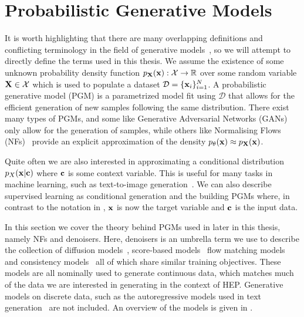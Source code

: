 \chapter{Probabilistic Generative Models}

It is worth highlighting that there are many overlapping definitions and conflicting terminology in the field of generative models~\cite{DiscriminativeVsGenerative, MachineLearningDiscriminative}, so we will attempt to directly define the terms used in this thesis.
We assume the existence of some unknown probability density function $p_{\mathbf{X}}(\mathbf{x}): \mathcal{X} \rightarrow \mathbb{R}$ over some random variable $\mathbf{X} \in \mathcal{X}$ which is used to populate a dataset $\mathcal{D} = \{\mathbf{x}_i\}_{i=1}^N$.
A probabilistic generative model (PGM) is a parametrized model fit using $\mathcal{D}$ that allows for the efficient generation of new samples following the same distribution.
There exist many types of PGMs, and some like Generative Adversarial Networks (GANs)~\cite{GenerativeAdversarialNetworks} only allow for the generation of samples, while others like Normalising Flows (NFs)~\cite{VariationalInferenceNormalizing} provide an explicit approximation of the density $p_{\theta}(\mathbf{x}) \approx p_{\mathbf{X}}(\mathbf{x})$.

Quite often we are also interested in approximating a conditional distribution $p_{X}(\mathbf{x}|\mathbf{c})$ where $\mathbf{c}$ is some context variable.
This is useful for many tasks in machine learning, such as text-to-image generation~\cite{Dalle}.
We can also describe supervised learning as conditional generation and the building PGMs where, in contrast to the notation in , $\mathbf{x}$ is now the target variable and $\mathbf{c}$ is the input data.

In this section we cover the theory behind PGMs used in later in this thesis, namely NFs and denoisers.
Here, denoisers is an umbrella term we use to describe the collection of diffusion models~\cite{DDPM, DDIM}, score-based models~\cite{ScoreBasedGenerativeModeling, ElucidatingDesignSpace} flow matching models~\cite{FlowStraightFast, FlowMatchingGenerative} and consistency models~\cite{ConsistencyModels, CM2} all of which share similar training objectives.
These models are all nominally used to generate continuous data, which matches much of the data we are interested in generating in the context of HEP.
Generative models on discrete data, such as the autoregressive models used in text generation~\cite{GPT2} are not included.
An overview of the models is given in .

